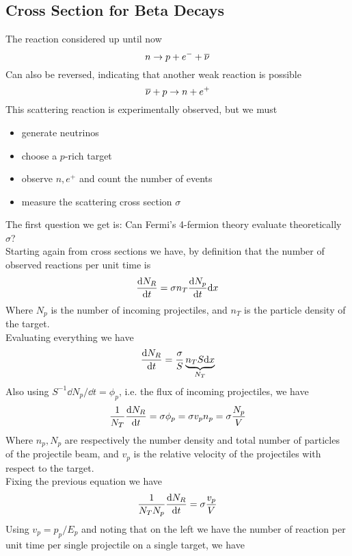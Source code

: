 \documentclass[../qm.tex]{subfiles}
\begin{document}
\subsection{Cross Section for Beta Decays}
The reaction considered up until now
\begin{equation*}
	n\to p+e^-+\overline{\nu}
\end{equation*}
Can also be reversed, indicating that another weak reaction is possible
\begin{equation}
	\overline{\nu}+p\to n+e^+
	\label{eq:neutrinoprotonscattering}
\end{equation}
This scattering reaction is experimentally observed, but we must
\begin{itemize}
\item generate neutrinos
\item choose a $p$-rich target
\item observe $n,e^+$ and count the number of events
\item measure the scattering cross section $\sigma$
\end{itemize}
The first question we get is: Can Fermi's 4-fermion theory evaluate theoretically $\sigma$?\\
Starting again from cross sections we have, by definition that the number of observed reactions per unit time is
\begin{equation*}
	\dv{N_R}{t}=\sigma n_T\dv{N_p}{t}\dd x
\end{equation*}
Where $N_p$ is the number of incoming projectiles, and $n_T$ is the particle density of the target.\\
Evaluating everything we have
\begin{equation*}
	\dv{N_R}{t}=\frac{\sigma}{S}\underbrace{n_TS\dd x}_{N_T}
\end{equation*}
Also using $S^{-1}\dd N_p/\dd t=\phi_p$, i.e. the flux of incoming projectiles, we have
\begin{equation*}
	\frac{1}{N_T}\dv{N_R}{t}=\sigma\phi_p=\sigma v_pn_p=\sigma\frac{N_p}{V}
\end{equation*}
Where $n_p,N_p$ are respectively the number density and total number of particles of the projectile beam, and $v_p$ is the relative velocity of the projectiles with respect to the target.\\
Fixing the previous equation we have
\begin{equation*}
	\frac{1}{N_TN_p}\dv{N_R}{t}=\sigma\frac{v_p}{V}
\end{equation*}
Using $v_p=p_p/E_p$ and noting that on the left we have the number of reaction per unit time per single projectile on a single target, we have
\end{document}
